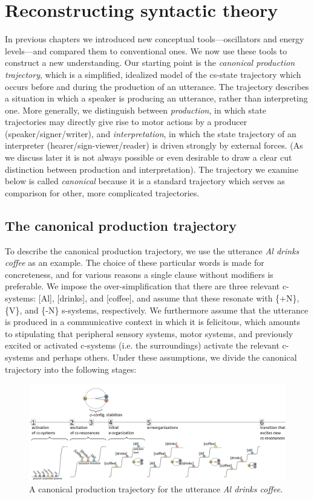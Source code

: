\chapter{Reconstructing syntactic theory}

In previous chapters we introduced new conceptual tools—oscillators and energy levels—and compared them to conventional ones. We now use these tools to construct a new understanding. Our starting point is the \textit{canonical production trajectory}, which is a simplified, idealized model of the cs-state trajectory which occurs before and during the production of an utterance. The trajectory describes a situation in which a speaker is producing an utterance, rather than interpreting one. More generally, we distinguish between \textit{production}, in which state trajectories may directly give rise to motor actions by a producer (speaker/signer/writer), and \textit{interpretation}, in which the state trajectory of an interpreter (hearer/sign-viewer/reader) is driven strongly by external forces. (As we discuss later it is not always possible or even desirable to draw a clear cut distinction between production and interpretation). The trajectory we examine below is called \textit{canonical} because it is a standard trajectory which serves as comparison for other, more complicated trajectories.

\section{The canonical production trajectory}

To describe the canonical production trajectory, we use the utterance \textit{Al drinks coffee} as an example. The choice of these particular words is made for concreteness, and for various reasons a single clause without modifiers is preferable. We impose the over-simplification that there are three relevant c-systems: [Al], [drinks], and [coffee], and assume that these resonate with \{+N\}, \{V\}, and \{-N\} s-systems, respectively. We furthermore assume that the utterance is produced in a communicative context in which it is felicitous, which amounts to stipulating that peripheral sensory systems, motor systems, and previously excited or activated c-systems (i.e. the surroundings) activate the relevant c-systems and perhaps others. Under these assumptions, we divide the canonical trajectory into the following stages:

  
\begin{figure}
\includegraphics[width=\textwidth]{figures/Tilsen-img51.png}
\caption{A canonical production trajectory for the utterance \textit{Al drinks coffee}.}
\label{fig:4:1}
\end{figure}
 


